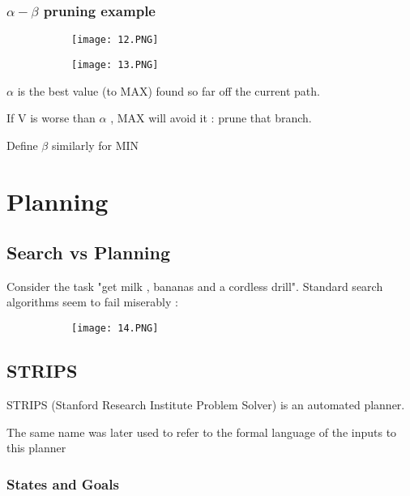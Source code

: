 \documentclass{article}
\begin{document}
\subsubsection{$\alpha-\beta$ pruning example}

\begin{figure}[ht!]
  \centering
  \begin{subfigure}[b]{0.4\linewidth}
    \texttt{[image: 12.PNG]}
  \end{subfigure}
     \begin{subfigure}[b]{0.29\textwidth}
         \centering
         \texttt{[image: 13.PNG]}
     \end{subfigure}
\end{figure}

$\alpha$ is the best value (to MAX) found so far off the current path. 

If V is worse than $\alpha$ , MAX will avoid it : prune that branch.

Define $\beta$ similarly for MIN

\section{Planning}

\subsection{Search vs Planning}

Consider the task "get milk , bananas and a cordless drill". Standard search algorithms seem to fail miserably :

\begin{figure}[ht!]
  \centering
  \begin{subfigure}[b]{0.6\linewidth}
    \texttt{[image: 14.PNG]}
  \end{subfigure}
\end{figure}

\subsection{STRIPS}

STRIPS (Stanford Research Institute Problem Solver) is an automated planner.

The same name was later used to refer to the formal language of the inputs to this planner

\subsubsection{States and Goals}
\end{document}
